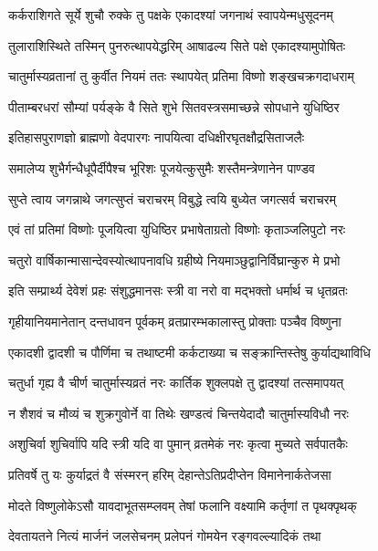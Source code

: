 \twolineshloka
{कर्कराशिगते सूर्ये शुचौ रुक्के तु पक्षके}
{एकादश्यां जगनाथं स्वापयेन्मधुसूदनम्} %

\twolineshloka
{तुलाराशिस्थिते तस्मिन् पुनरुत्थापयेद्धरिम्}
{आषाढल्य सिते पक्षे एकादश्यामुपोषितः} %

\twolineshloka
{चातुर्मास्यव्रतानां तु कुर्वीत नियमं ततः}
{स्थापयेत् प्रतिमा विष्णो शङ्खचक्रगदाधराम्} %

\twolineshloka
{पीताम्बरधरां सौम्यां पर्यङ्के वै सिते शुभे}
{सितवस्त्रसमाच्छन्ने सोपधाने युधिष्ठिर} %

\twolineshloka
{इतिहासपुराणज्ञो ब्राह्मणो वेदपारगः}
{नापयित्वा दधिक्षीरघृतक्षौद्रसिताजलैः} %

\twolineshloka
{समालेप्य शुभैर्गन्धैधूपैर्दीपैश्च भूरिशः}
{पूजयेत्कुसुमैः शस्तैमन्त्रेणानेन पाण्डव} %

\twolineshloka
{सुप्ते त्वाय जगन्नाथे जगत्सुप्तं चराचरम्}
{विबुद्धे त्वयि बुध्येत जगत्सर्व चराचरम्} %

\twolineshloka
{एवं तां प्रतिमां विष्णोः पूजयित्वा युधिष्ठिर}
{प्रभाषेताग्रतो विष्णोः कृताञ्जलिपुटो नरः} %

\twolineshloka
{चतुरो वार्षिकान्मासान्देवस्योत्थापनावधि}
{ग्रहीष्ये नियमाञ्छुद्वानिर्विघ्रान्कुरु मे प्रभो} %

\twolineshloka
{इति सम्प्रार्थ्य देवेशं प्रहः संशुद्धमानसः}
{स्त्री वा नरो वा मद्भक्तो धर्मार्थ च धृतव्रतः} %

\twolineshloka
{गृहीयानियमानेतान् दन्तधावन पूर्वकम्}
{व्रतप्रारम्भकालास्तु प्रोक्ताः पञ्चैव विष्णुना} %

\twolineshloka
{एकादशी द्वादशी च पौर्णिमा च तथाष्टमी}
{कर्कटाख्या च सङ्क्रान्तिस्तेषु कुर्याद्यथाविधि} %

\twolineshloka
{चतुर्धा गृह्य वै चीर्ण चातुर्मास्यव्रतं नरः}
{कार्तिक शुक्लपक्षे तु द्वादश्यां तत्समापयत्} %

\twolineshloka
{न शैशवं च मौव्यं च शुक्रगुवोर्ने वा तिथेः}
{खण्डत्वं चिन्तयेदादौ चातुर्मास्यविधौ नरः} %

\twolineshloka
{अशुचिर्वा शुचिर्वापि यदि स्त्री यदि वा पुमान्}
{व्रतमेकं नरः कृत्वा मुच्यते सर्वपातकैः} %

\twolineshloka
{प्रतिवर्षे तु यः कुर्याद्रतं वै संस्मरन् हरिम्}
{देहान्तेऽतिप्रदीप्तेन विमानेनार्कतेजसा} %

\twolineshloka
{मोदते विष्णुलोकेऽसौ यावदाभूतसम्प्लवम्}
{तेषां फलानि वक्ष्यामि कर्तृणां त पृथक्पृथक्} %

\twolineshloka
{देवतायतने नित्यं मार्जनं जलसेचनम्}
{प्रलेपनं गोमयेन रङ्गवल्ल्यादिकं तथा} %

